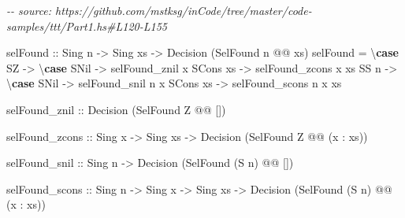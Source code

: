 \documentclass[]{article}
\newenvironment{Shaded}{}{}
\newcommand{\CommentTok}[1]{\textcolor[rgb]{0.38,0.63,0.69}{\textit{#1}}}
\newcommand{\DataTypeTok}[1]{\textcolor[rgb]{0.56,0.13,0.00}{#1}}
\newcommand{\KeywordTok}[1]{\textcolor[rgb]{0.00,0.44,0.13}{\textbf{#1}}}
\newcommand{\NormalTok}[1]{#1}
\newcommand{\OperatorTok}[1]{\textcolor[rgb]{0.40,0.40,0.40}{#1}}
\newcommand{\OtherTok}[1]{\textcolor[rgb]{0.00,0.44,0.13}{#1}}
\begin{document}
\begin{Shaded}
\begin{Highlighting}[]
\CommentTok{{-}{-} source: https://github.com/mstksg/inCode/tree/master/code{-}samples/ttt/Part1.hs\#L120{-}L155}

\NormalTok{selFound}
\OtherTok{    ::} \DataTypeTok{Sing}\NormalTok{ n}
    \OtherTok{{-}\textgreater{}} \DataTypeTok{Sing}\NormalTok{ xs}
    \OtherTok{{-}\textgreater{}} \DataTypeTok{Decision}\NormalTok{ (}\DataTypeTok{SelFound}\NormalTok{ n }\OperatorTok{@@}\NormalTok{ xs)}
\NormalTok{selFound }\OtherTok{=}\NormalTok{ \textbackslash{}}\KeywordTok{case}
    \DataTypeTok{SZ} \OtherTok{{-}\textgreater{}}\NormalTok{ \textbackslash{}}\KeywordTok{case}
      \DataTypeTok{SNil}         \OtherTok{{-}\textgreater{}}\NormalTok{ selFound\_znil}
\NormalTok{      x }\OtherTok{\textasciigrave{}SCons\textasciigrave{}}\NormalTok{ xs }\OtherTok{{-}\textgreater{}}\NormalTok{ selFound\_zcons x xs}
    \DataTypeTok{SS}\NormalTok{ n }\OtherTok{{-}\textgreater{}}\NormalTok{ \textbackslash{}}\KeywordTok{case}
      \DataTypeTok{SNil}         \OtherTok{{-}\textgreater{}}\NormalTok{ selFound\_snil n}
\NormalTok{      x }\OtherTok{\textasciigrave{}SCons\textasciigrave{}}\NormalTok{ xs }\OtherTok{{-}\textgreater{}}\NormalTok{ selFound\_scons n x xs}

\NormalTok{selFound\_znil}
\OtherTok{    ::} \DataTypeTok{Decision}\NormalTok{ (}\DataTypeTok{SelFound} \DataTypeTok{\textquotesingle{}Z} \OperatorTok{@@}\NormalTok{ \textquotesingle{}[])}

\NormalTok{selFound\_zcons}
\OtherTok{    ::} \DataTypeTok{Sing}\NormalTok{ x}
    \OtherTok{{-}\textgreater{}} \DataTypeTok{Sing}\NormalTok{ xs}
    \OtherTok{{-}\textgreater{}} \DataTypeTok{Decision}\NormalTok{ (}\DataTypeTok{SelFound} \DataTypeTok{\textquotesingle{}Z} \OperatorTok{@@}\NormalTok{ (x \textquotesingle{}}\OperatorTok{:}\NormalTok{ xs))}

\NormalTok{selFound\_snil}
\OtherTok{    ::} \DataTypeTok{Sing}\NormalTok{ n}
    \OtherTok{{-}\textgreater{}} \DataTypeTok{Decision}\NormalTok{ (}\DataTypeTok{SelFound}\NormalTok{ (}\DataTypeTok{\textquotesingle{}S}\NormalTok{ n) }\OperatorTok{@@}\NormalTok{ \textquotesingle{}[])}

\NormalTok{selFound\_scons}
\OtherTok{    ::} \DataTypeTok{Sing}\NormalTok{ n}
    \OtherTok{{-}\textgreater{}} \DataTypeTok{Sing}\NormalTok{ x}
    \OtherTok{{-}\textgreater{}} \DataTypeTok{Sing}\NormalTok{ xs}
    \OtherTok{{-}\textgreater{}} \DataTypeTok{Decision}\NormalTok{ (}\DataTypeTok{SelFound}\NormalTok{ (}\DataTypeTok{\textquotesingle{}S}\NormalTok{ n) }\OperatorTok{@@}\NormalTok{ (x \textquotesingle{}}\OperatorTok{:}\NormalTok{ xs))}
\end{Highlighting}
\end{Shaded}
\end{document}
